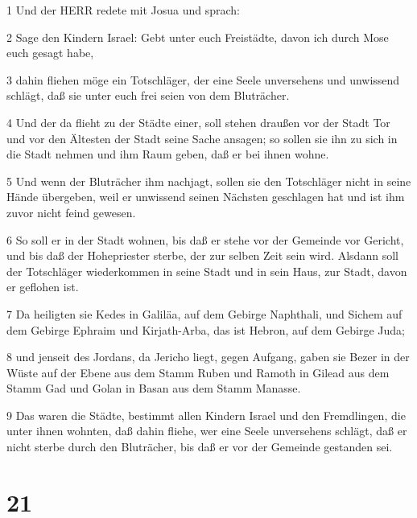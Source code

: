 \par 1 Und der HERR redete mit Josua und sprach:
\par 2 Sage den Kindern Israel: Gebt unter euch Freistädte, davon ich durch Mose euch gesagt habe,
\par 3 dahin fliehen möge ein Totschläger, der eine Seele unversehens und unwissend schlägt, daß sie unter euch frei seien von dem Bluträcher.
\par 4 Und der da flieht zu der Städte einer, soll stehen draußen vor der Stadt Tor und vor den Ältesten der Stadt seine Sache ansagen; so sollen sie ihn zu sich in die Stadt nehmen und ihm Raum geben, daß er bei ihnen wohne.
\par 5 Und wenn der Bluträcher ihm nachjagt, sollen sie den Totschläger nicht in seine Hände übergeben, weil er unwissend seinen Nächsten geschlagen hat und ist ihm zuvor nicht feind gewesen.
\par 6 So soll er in der Stadt wohnen, bis daß er stehe vor der Gemeinde vor Gericht, und bis daß der Hohepriester sterbe, der zur selben Zeit sein wird. Alsdann soll der Totschläger wiederkommen in seine Stadt und in sein Haus, zur Stadt, davon er geflohen ist.
\par 7 Da heiligten sie Kedes in Galiläa, auf dem Gebirge Naphthali, und Sichem auf dem Gebirge Ephraim und Kirjath-Arba, das ist Hebron, auf dem Gebirge Juda;
\par 8 und jenseit des Jordans, da Jericho liegt, gegen Aufgang, gaben sie Bezer in der Wüste auf der Ebene aus dem Stamm Ruben und Ramoth in Gilead aus dem Stamm Gad und Golan in Basan aus dem Stamm Manasse.
\par 9 Das waren die Städte, bestimmt allen Kindern Israel und den Fremdlingen, die unter ihnen wohnten, daß dahin fliehe, wer eine Seele unversehens schlägt, daß er nicht sterbe durch den Bluträcher, bis daß er vor der Gemeinde gestanden sei.

\chapter{21}

